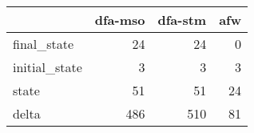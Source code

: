 \begin{tabular}{lrrr}
\toprule
{} &  dfa-mso &  dfa-stm &  afw \\
\midrule
final\_state   &       24 &       24 &    0 \\
initial\_state &        3 &        3 &    3 \\
state         &       51 &       51 &   24 \\
delta         &      486 &      510 &   81 \\
\bottomrule
\end{tabular}
